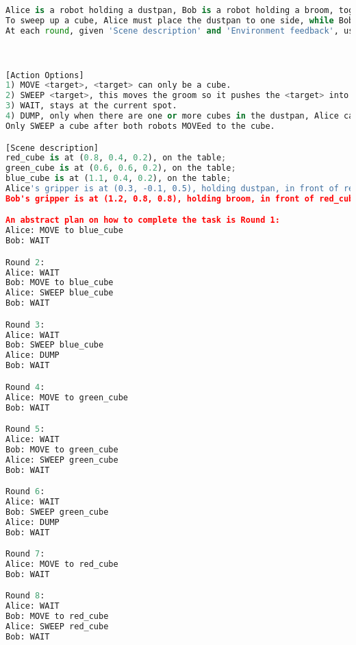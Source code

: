 
\begin{lstlisting}[language=Python]
Alice is a robot holding a dustpan, Bob is a robot holding a broom, together they must firstly sweep up the blue cube and dump it into the trash bin, secondly sweep up the green cube and dump into the trash bin, thirdly sweep up the red cube and dump into the trash bin, the order can not be disrupted.
To sweep up a cube, Alice must place the dustpan to one side, while Bob must sweep the cube from the other side into the dustpan.
At each round, given 'Scene description' and 'Environment feedback', use it to reason about the task, and improve any previous plans. Each robot does **exactly** one action per round.



[Action Options]
1) MOVE <target>, <target> can only be a cube.
2) SWEEP <target>, this moves the groom so it pushes the <target> into dustpan, only Bob can SWEEP, Alice must WAIT in front of the same <target> cube when Bob SWEEP.
3) WAIT, stays at the current spot.
4) DUMP, only when there are one or more cubes in the dustpan, Alice can DUMP it into trash_bin.
Only SWEEP a cube after both robots MOVEed to the cube.

[Scene description]
red_cube is at (0.8, 0.4, 0.2), on the table; 
green_cube is at (0.6, 0.6, 0.2), on the table; 
blue_cube is at (1.1, 0.4, 0.2), on the table; 
Alice's gripper is at (0.3, -0.1, 0.5), holding dustpan, in front of red_cube with distance: 0.62, in front of green_cube with distance: 0.59, in front of blue_cube with distance: 0.89
Bob's gripper is at (1.2, 0.8, 0.8), holding broom, in front of red_cube with distance: 0.59, in front of green_cube with distance: 0.63, in front of blue_cube with distance: 0.47

An abstract plan on how to complete the task is Round 1:
Alice: MOVE to blue_cube
Bob: WAIT

Round 2:
Alice: WAIT
Bob: MOVE to blue_cube
Alice: SWEEP blue_cube
Bob: WAIT

Round 3:
Alice: WAIT
Bob: SWEEP blue_cube
Alice: DUMP
Bob: WAIT

Round 4:
Alice: MOVE to green_cube
Bob: WAIT

Round 5:
Alice: WAIT
Bob: MOVE to green_cube
Alice: SWEEP green_cube
Bob: WAIT

Round 6:
Alice: WAIT
Bob: SWEEP green_cube
Alice: DUMP
Bob: WAIT

Round 7:
Alice: MOVE to red_cube
Bob: WAIT

Round 8:
Alice: WAIT
Bob: MOVE to red_cube
Alice: SWEEP red_cube
Bob: WAIT


\end{lstlisting}
